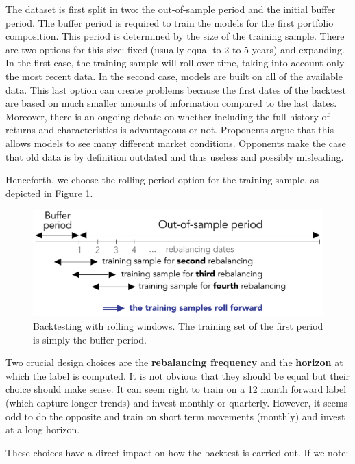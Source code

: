 \documentclass[]{krantz}
\theoremstyle{definition}
\theoremstyle{definition}
\theoremstyle{definition}
\theoremstyle{remark}
\begin{document}
The dataset is first split in two: the out-of-sample period and the
initial buffer period. The buffer period is required to train the models
for the first portfolio composition. This period is determined by the
size of the training sample. There are two options for this size: fixed
(usually equal to 2 to 5 years) and expanding. In the first case, the
training sample will roll over time, taking into account only the most
recent data. In the second case, models are built on all of the
available data. This last option can create problems because the first
dates of the backtest are based on much smaller amounts of information
compared to the last dates. Moreover, there is an ongoing debate on
whether including the full history of returns and characteristics is
advantageous or not. Proponents argue that this allows models to see
many different market conditions. Opponents make the case that old data
is by definition outdated and thus useless and possibly misleading.

Henceforth, we choose the rolling period option for the training sample,
as depicted in Figure \ref{fig:backtestoos}.

\begin{figure}[H]

{\centering \includegraphics[width=450px]{images/backtestoos} 

}

\caption{Backtesting with rolling windows. The training set of the first period is simply the buffer period.}\label{fig:backtestoos}
\end{figure}

Two crucial design choices are the \textbf{rebalancing frequency} and
the \textbf{horizon} at which the label is computed. It is not obvious
that they should be equal but their choice should make sense. It can
seem right to train on a 12 month forward label (which capture longer
trends) and invest monthly or quarterly. However, it seems odd to do the
opposite and train on short term movements (monthly) and invest at a
long horizon.

These choices have a direct impact on how the backtest is carried out.
If we note:
\end{document}
